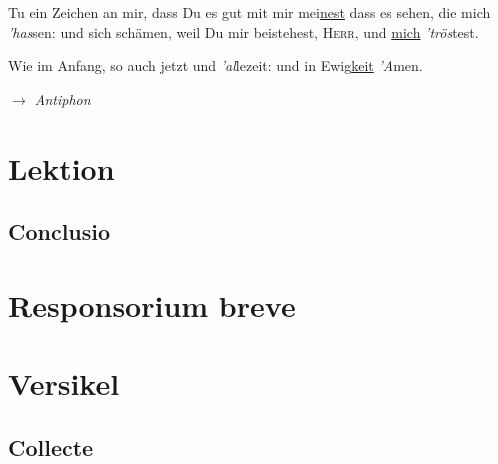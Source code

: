 \begin{multicols}{2}
 Tu ein Zeichen an mir, dass Du es gut mit mir mei\underline{nest} \gredagger{} dass es sehen, die mich \emph{'has}sen: \grestar{} und sich schämen, weil Du mir beistehest, \textsc{Herr}, und \underline{mich} \emph{'trös}test.\par
 \par
 Wie im Anfang, so auch jetzt und \emph{'al}lezeit: \grestar{} und in Ewig\underline{keit} \emph{'A}men.\par
  \textit{$\rightarrow$ Antiphon}
\end{multicols}
\section*{Lektion} \subsection*{Conclusio}
\section*{Responsorium breve}
\section*{Versikel}

\subsection*{Collecte}

